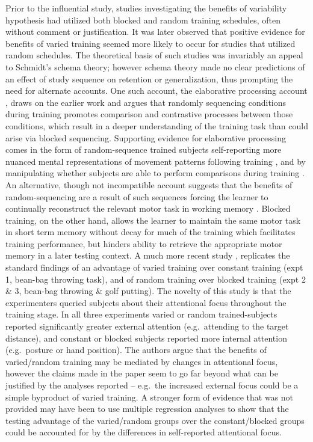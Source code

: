 \documentclass[
  12pt,
  letterpaper,
]{article}
\begin{document}
Prior to the influential
\textcite{sheaContextualInterferenceEffects1979} study, studies
investigating the benefits of variability hypothesis had utilized both
blocked and random training schedules, often without comment or
justification. It was later observed
\autocite{leeInfluencePracticeSchedule1985} that positive evidence for
benefits of varied training seemed more likely to occur for studies that
utilized random schedules. The theoretical basis of such studies was
invariably an appeal to Schmidt's schema theory; however schema theory
made no clear predictions of an effect of study sequence on retention or
generalization, thus prompting the need for alternate accounts. One such
account, the elaborative processing account
\autocite{sheaContextEffectsMemory1983}, draws on the earlier work
\autocite{battigFacilitationInterference1966} and argues that randomly
sequencing conditions during training promotes comparison and
contrastive processes between those conditions, which result in a deeper
understanding of the training task than could arise via blocked
sequencing. Supporting evidence for elaborative processing comes in the
form of random-sequence trained subjects self-reporting more nuanced
mental representations of movement patterns following training
\autocite{sheaContextEffectsMemory1983}, and by manipulating whether
subjects are able to perform comparisons during training
\autocite{wrightContributionElaborativeProcessing1992}. An alternative,
though not incompatible account suggests that the benefits of
random-sequencing are a result of such sequences forcing the learner to
continually reconstruct the relevant motor task in working memory
\autocite{leeLocusContextualInterference}. Blocked training, on the
other hand, allows the learner to maintain the same motor task in short
term memory without decay for much of the training which facilitates
training performance, but hinders ability to retrieve the appropriate
motor memory in a later testing context. A much more recent study
\autocite{chuaPracticeVariabilityPromotes2019}, replicates the standard
findings of an advantage of varied training over constant training (expt
1, bean-bag throwing task), and of random training over blocked training
(expt 2 \& 3, bean-bag throwing \& golf putting). The novelty of this
study is that the experimenters queried subjects about their attentional
focus throughout the training stage. In all three experiments varied or
random trained-subjects reported significantly greater external
attention (e.g.~attending to the target distance), and constant or
blocked subjects reported more internal attention (e.g.~posture or hand
position). The authors argue that the benefits of varied/random training
may be mediated by changes in attentional focus, however the claims made
in the paper seem to go far beyond what can be justified by the analyses
reported -- e.g.~the increased external focus could be a simple
byproduct of varied training. A stronger form of evidence that was not
provided may have been to use multiple regression analyses to show that
the testing advantage of the varied/random groups over the
constant/blocked groups could be accounted for by the differences in
self-reported attentional focus.
\end{document}

